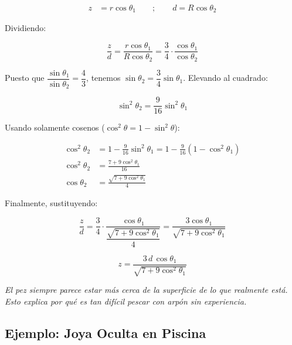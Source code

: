 \documentclass[12pt, a4paper]{article}
\theoremstyle{definition}
\newcommand{\nota}[1]{\medskip\noindent\colorbox{grisclaro}{\parbox{0.95\linewidth}{\textit{#1}}}\medskip}
\begin{document}
\begin{align}
  z &= r\cos\theta_1 \qquad ; \qquad d = R\cos\theta_2
  \label{eq:componentes_verticales}
\end{align}

Dividiendo:

\begin{equation}
  \frac{z}{d} = \frac{r\cos\theta_1}{R\cos\theta_2} = \frac{3}{4}\cdot\frac{\cos\theta_1}{\cos\theta_2}
  \label{eq:z_d}
\end{equation}

Puesto que \(\dfrac{\sin\theta_1}{\sin\theta_2} = \dfrac{4}{3}\), tenemos
\(\sin\theta_2 = \dfrac{3}{4}\sin\theta_1\). Elevando al cuadrado:

\begin{equation}
  \sin^2\theta_2 = \frac{9}{16}\sin^2\theta_1
  \label{eq:sin2}
\end{equation}

Usando solamente cosenos (\(\cos^2\theta = 1 - \sin^2\theta\)):

\begin{align}
  \cos^2\theta_2 &= 1 - \frac{9}{16}\sin^2\theta_1 = 1 - \frac{9}{16}(1-\cos^2\theta_1) \nonumber \\
  \cos^2\theta_2 &= \frac{7 + 9\cos^2\theta_1}{16} \nonumber \\
  \cos\theta_2   &= \frac{\sqrt{7 + 9\cos^2\theta_1}}{4}
  \label{eq:cos_theta2}
\end{align}

Finalmente, sustituyendo:

\begin{equation}
  \frac{z}{d} = \frac{3}{4}\cdot\frac{\cos\theta_1}{\dfrac{\sqrt{7+9\cos^2\theta_1}}{4}}
              = \frac{3\cos\theta_1}{\sqrt{7+9\cos^2\theta_1}}
  \label{eq:z_d_final}
\end{equation}

\begin{equation}
  \boxed{z = \frac{3\,d\,\cos\theta_1}{\sqrt{7 + 9\cos^2\theta_1}}}
  \label{eq:z_final}
\end{equation}

\nota{El pez siempre parece estar más cerca de la superficie de lo que realmente está. Esto
explica por qué es tan difícil pescar con arpón sin experiencia.}

\subsection{Ejemplo: Joya Oculta en Piscina}
\label{sec:joya_piscina}
\end{document}
